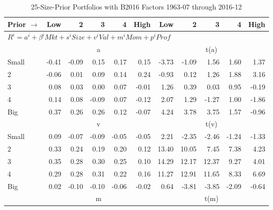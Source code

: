 
\begin{table}[!ht]
\centering
\caption{25-Size-Prior Portfolios with B2016 Factors 1963-07 through 2016-12}
\begin{tabular}{lrrrrrrrrrr}
  \toprule
    Prior $\rightarrow$ & Low & 2 & 3 & 4 & High & Low & 2 & 3 & 4 & High \\ 
  \midrule
  \multicolumn{11}{l}{$R^i=a^i+\beta^iMkt+s^iSize+v^iVal+m^iMom+p^iProf$} \\

  
    
      & \multicolumn{5}{c}{a} & \multicolumn{5}{c}{t(a)}
    
    \\
      \cmidrule(r){2-6} \cmidrule(r){7-11}

    Small   & -0.41  & -0.09  & 0.15  & 0.17  & 0.15  & -3.73  & -1.09  & 1.56  & 1.60  & 1.37  \\
         2  & -0.06  & 0.01  & 0.09  & 0.14  & 0.24  & -0.93  & 0.12  & 1.26  & 1.88  & 3.16  \\
         3  & 0.08  & 0.03  & 0.00  & 0.07  & -0.01  & 1.26  & 0.39  & 0.03  & 0.95  & -0.19  \\
         4  & 0.14  & 0.08  & -0.09  & 0.07  & -0.12  & 2.07  & 1.29  & -1.27  & 1.00  & -1.86  \\
    Big     & 0.37  & 0.26  & 0.26  & 0.12  & -0.07  & 4.24  & 3.78  & 3.75  & 1.57  & -0.96  \\

  
    
      & \multicolumn{5}{c}{v} & \multicolumn{5}{c}{t(v)}
    
    \\
      \cmidrule(r){2-6} \cmidrule(r){7-11}

    Small   & 0.09  & -0.07  & -0.09  & -0.05  & -0.05  & 2.21  & -2.35  & -2.46  & -1.24  & -1.33  \\
         2  & 0.33  & 0.24  & 0.19  & 0.20  & 0.12  & 13.40  & 10.05  & 7.45  & 7.38  & 4.23  \\
         3  & 0.35  & 0.28  & 0.30  & 0.25  & 0.10  & 14.29  & 12.17  & 12.37  & 9.27  & 4.01  \\
         4  & 0.29  & 0.28  & 0.31  & 0.22  & 0.16  & 11.27  & 12.91  & 11.65  & 8.33  & 6.69  \\
    Big     & 0.02  & -0.10  & -0.10  & -0.06  & -0.02  & 0.64  & -3.81  & -3.85  & -2.09  & -0.64  \\

  
    
      & \multicolumn{5}{c}{m} & \multicolumn{5}{c}{t(m)}
    

\end{tabular}
\end{table}
